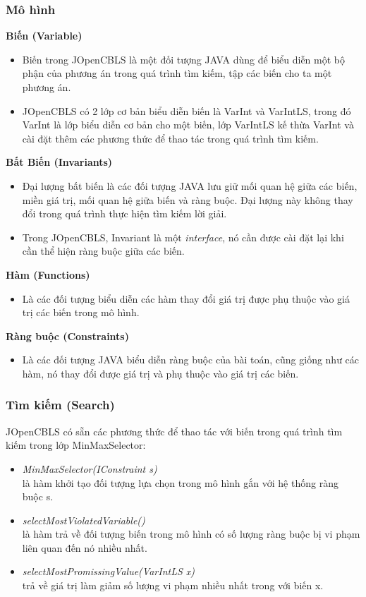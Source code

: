 \subsubsection{Mô hình}
\textbf{Biến (Variable)}
\begin{itemize}
	\item Biến trong JOpenCBLS là một đối tượng JAVA dùng để biểu diễn một bộ phận của phương án trong quá trình tìm kiếm, tập các biến cho ta một phương án.
	\item JOpenCBLS có 2 lớp cơ bản biểu diễn biến là \textsf{VarInt} và \textsf{VarIntLS}, trong đó \textsf{VarInt} là lớp biểu diễn cơ bản cho một biến, lớp \textsf{VarIntLS} kế thừa \textsf{VarInt} và cài đặt thêm các phương thức để thao tác trong quá trình tìm kiếm.
\end{itemize}

\textbf{Bất Biến (Invariants)}
\begin{itemize}
	\item Đại lượng bất biến là các đối tượng JAVA lưu giữ mối quan hệ giữa các biến, miền giá trị, mối quan hệ giữa biến và ràng buộc. Đại lượng này không thay đổi trong quá trình thực hiện tìm kiếm lời giải.
	\item Trong JOpenCBLS, \textsf{Invariant} là một \textit{interface}, nó cần được cài đặt lại khi cần thể hiện ràng buộc giữa các biến.
\end{itemize}

\textbf{Hàm (Functions)}
\begin{itemize}
	\item Là các đối tượng biểu diễn các hàm thay đổi giá trị được phụ thuộc vào giá trị các biến trong mô hình.
\end{itemize}

\textbf{Ràng buộc (Constraints)}
\begin{itemize}
	\item Là các đối tượng JAVA biểu diễn ràng buộc của bài toán, cũng giống như các hàm, nó thay đổi được giá trị và phụ thuộc vào giá trị các biến.
\end{itemize}

\subsubsection{Tìm kiếm (Search)}
JOpenCBLS có sẵn các phương thức để thao tác với biến trong quá trình tìm kiếm trong lớp \textsf{MinMaxSelector}:
\begin{itemize}
	\item \textit{MinMaxSelector(IConstraint s)}\\ là hàm khởi tạo đối tượng lựa chọn trong mô hình gắn với hệ thống ràng buộc s.
	\item \textit{selectMostViolatedVariable()}\\ là hàm trả về đối tượng biến trong mô hình có số lượng ràng buộc bị vi phạm liên quan đến nó nhiều nhất.
	\item \textit{selectMostPromissingValue(VarIntLS x)}\\ trả về giá trị làm giảm số lượng vi phạm nhiều nhất trong với biến x.
\end{itemize}

